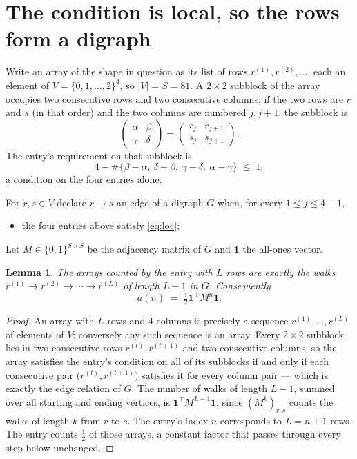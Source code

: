 \documentclass[11pt,a4paper]{article}
\theoremstyle{plain}
\newtheorem{lemma}[theorem]{Lemma}
\theoremstyle{definition}
\begin{document}
\section{The condition is local, so the rows form a digraph}

Write an array of the shape in question as its list of rows
$r^{(1)},r^{(2)},\dots$, each an element of
$V=\{0,1,\dots,2\}^{4}$, so $|V|=S=81$. A $2\times2$ subblock of the array
occupies two consecutive rows and two consecutive columns; if the two rows are $r$
and $s$ (in that order) and the two columns are numbered $j,j+1$,
the subblock is
\[
\begin{pmatrix}\alpha&\beta\\\gamma&\delta\end{pmatrix}=\begin{pmatrix}r_j&r_{j+1}\\s_j&s_{j+1}\end{pmatrix}.
\]
The entry's requirement on that subblock is
\begin{equation}\label{eq:loc}
4-\#\{\beta-\alpha,\ \delta-\beta,\ \gamma-\delta,\ \alpha-\gamma\}\;\le\;1,
\end{equation}
a condition on the four entries alone.

For $r,s\in V$ declare $r\to s$ an edge of a digraph $G$ when, for every
$1\le j\le 4-1$,
\begin{itemize}
\item the four entries above satisfy \eqref{eq:loc};

\end{itemize}
Let $M\in\{0,1\}^{S\times S}$ be the adjacency matrix of $G$ and $\mathbf{1}$ the
all-ones vector.

\begin{lemma}\label{lem:walk}
The arrays counted by the entry with $L$ rows are exactly the walks
$r^{(1)}\to r^{(2)}\to\cdots\to r^{(L)}$ of length $L-1$ in $G$. Consequently
\[
a(n)\;=\;\tfrac1{2}\mathbf{1}^{\!\top}M^{n}\mathbf{1} .
\]
\end{lemma}

\begin{proof}
An array with $L$ rows and $4$ columns is precisely a sequence
$r^{(1)},\dots,r^{(L)}$ of elements of $V$; conversely any such sequence is an array.
Every $2\times2$ subblock lies in two consecutive rows $r^{(t)},r^{(t+1)}$ and two
consecutive columns, so the array satisfies the entry's condition on all of its subblocks
if and only if each consecutive pair $\bigl(r^{(t)},r^{(t+1)}\bigr)$ satisfies it for
every column pair --- which is exactly the edge relation of $G$. The number of walks of
length $L-1$, summed over all starting and ending vertices, is
$\mathbf{1}^{\!\top}M^{L-1}\mathbf{1}$, since $(M^{k})_{r,s}$ counts the walks of
length $k$ from $r$ to $s$. The entry's index $n$ corresponds to $L=n+1$ rows. The entry counts $\tfrac1{2}$ of those arrays, a constant factor that passes through every step below unchanged.
\end{proof}
\end{document}
